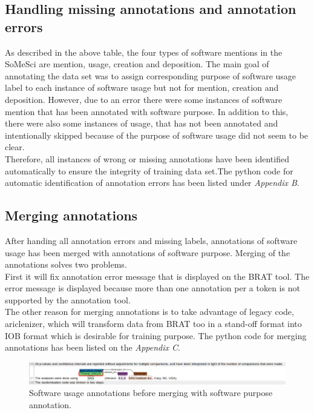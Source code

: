 \subsection{Handling missing annotations and annotation errors }
\label{subsec:dataset:preprocessing:handlingerrors}

As described in the above table, the four types of software mentions in the SoMeSci are mention, usage, creation and deposition. The main goal of annotating the data set was to assign corresponding purpose of software usage label to each instance of software usage but not for mention, creation and deposition. However, due to an error there were some instances of software mention that has been annotated with software purpose. In addition to this, there were also some instances of usage, that has not been annotated and intentionally skipped because of the purpose of software usage did not seem to be clear. \\

Therefore, all instances of wrong or missing annotations have been identified automatically to ensure the integrity of training data set.The python code for automatic identification of annotation errors has been listed under \emph{Appendix B}.

\subsection{Merging annotations}
\label{subsec:dataset:preprocessing:Merging}

After handing all annotation errors and missing labels, annotations of software usage has been merged with annotations of software purpose. Merging of the annotations solves two problems. \\

First it will fix annotation error message that is displayed on the BRAT tool. The error message is displayed because more than one annotation per a token is not supported by the annotation tool. \\

The other reason for merging annotations is to take advantage of legacy code, ariclenizer, which will transform data from BRAT too in a stand-off format  into IOB format which is desirable for training purpose. The python code for merging annotations has been listed on the \emph{Appendix C}.

\begin{figure}[htbp]
	\centering
	\includegraphics[width=.95\textwidth]{4.graphics/figures/chap4/merging/2002515_plm_unm}
	\caption{Software usage annotations before merging with software purpose  annotation.}
	
	\label{fig:chapter04:setup}
\end{figure}

